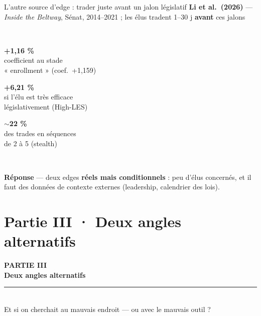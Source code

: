 \documentclass[11pt,aspectratio=169]{beamer}
\newcommand{\tuile}[3]{%
  \begin{minipage}[t]{0.23\textwidth}\centering
    \colorbox{#1}{\parbox[c][21mm][c]{\dimexpr\linewidth-8pt}{\centering
      {\color{white}\Large\textbf{#2}}\\[0.6mm]
      {\color{white}\footnotesize #3}}}
  \end{minipage}}
\newcommand{\repband}[1]{%
  \colorbox{okgreen!12}{\parbox{\dimexpr\textwidth-10pt}{\scriptsize
    \textbf{\textcolor{okgreen}{Réponse}}\; --- #1}}}
\begin{document}
\begin{frame}{L'autre source d'edge : trader juste avant un jalon législatif}
  \centering
  {\footnotesize\textbf{Li et al.\ (2026)} --- \emph{Inside the Beltway}, Sénat, 2014--2021 ;
   les élus tradent 1--30 j \textbf{avant} ces jalons}\\[3.5mm]
  \\[4mm]
  \tuile{helec}{+1,16 \%}{coefficient au stade\\« enrollment » (coef.\ +1,159)}\hfill
  \tuile{okgreen}{+6,21 \%}{si l'élu est très efficace\\législativement (High-LES)}\hfill
  \tuile{warnorange}{$\sim$22 \%}{des trades en séquences\\de 2 à 5 (stealth)}\\[3.5mm]
  \repband{deux edges \textbf{réels mais conditionnels} : peu d'élus concernés, et il faut des
   données de contexte externes (leadership, calendrier des lois).}
\end{frame}

\section{Partie III · Deux angles alternatifs}

\begin{frame}[plain]
  \centering
  \vspace{12mm}
  {\color{helec!85}\large\textbf{PARTIE III}}\\[3mm]
  {\color{black!88}\fontsize{30}{34}\selectfont\textbf{Deux angles alternatifs}}\\[3mm]
  {\color{helec!45}\rule{0.30\textwidth}{1.2pt}}\\[3mm]
  {\color{black!55}\large Et si on cherchait au mauvais endroit --- ou avec le mauvais outil ?}
\end{frame}
\end{document}
